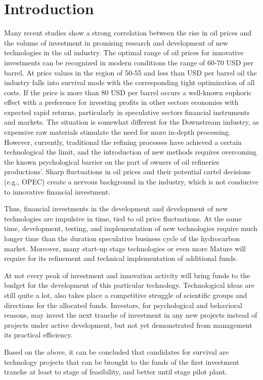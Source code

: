 \documentclass[12pt]{report}
\theoremstyle{definition}
\begin{document}
\chapter{Introduction}
Many recent studies show a strong correlation between the rise in oil prices and the volume of investment in promising research and development of new technologies in the oil industry.
The optimal range of oil prices for innovative investments can be recognized in modern conditions the range of 60-70 USD per barrel.
At price values in the region of 50-55 and less than USD per barrel oil the industry falls into survival mode with the corresponding tight optimization of all costs.
If the price is more than 80 USD per barrel occurs a well-known euphoric effect with a preference for investing profits in other sectors
economies with expected rapid returns, particularly in speculative sectors financial instruments and markets.
The situation is somewhat different for the Downstream industry, as expensive raw materials stimulate the need for more in-depth processing. However, currently, traditional the refining processes have achieved a certain technological the limit, and the introduction of new methods requires overcoming the known psychological barrier on the part of owners of oil refineries productions'. 
Sharp fluctuations in oil prices and their potential cartel decisions (e.g., OPEC) create a nervous background in the industry,
which is not conducive to innovative financial investment.

Thus, financial investments in the development and development of new technologies are impulsive in time, tied to oil price fluctuations.
At the same time, development, testing, and implementation of new technologies require much longer time than the duration speculative business cycle of the hydrocarbon market. 
Moreover, many start-up stage technologies or even more Mature will require for its refinement and technical implementation of additional funds. 

At not every peak of investment and innovation activity will bring funds to the budget for the development of this particular technology.
Technological ideas are still quite a lot, also takes place a competitive struggle of scientific groups and directions for the allocated funds.
Investors, for psychological and behavioral reasons, may invest the next tranche of investment in any new projects instead of projects under active development, but not yet demonstrated from management its practical efficiency. 

Based on the above, it can be concluded that candidates for survival are technology projects that can be brought to the funds of the first investment tranche at least to stage of feasibility, and better until stage pilot plant.
\end{document}
